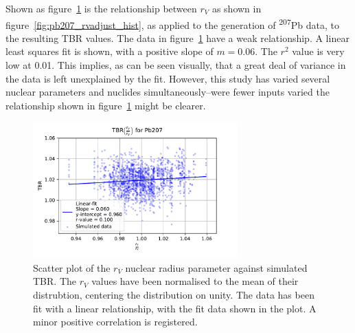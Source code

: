 Shown as figure~\ref{fig:pb207_rvadjust} is the relationship between $r_{V}$ as shown in figure~\ref{fig:pb207_rvadjust_hist}, as applied to the generation of \textsuperscript{207}Pb data, to the resulting TBR values. The data in figure~\ref{fig:pb207_rvadjust} have a weak relationship. A linear least squares fit is shown, with a positive slope of $m=0.06$. The $r^{2}$ value is very low at 0.01. This implies, as can be seen visually, that a great deal of variance in the data is left unexplained by the fit. However, this study has varied several nuclear parameters and nuclides simultaneously--were fewer inputs varied the relationship shown in figure~\ref{fig:pb207_rvadjust} might be clearer. 

\begin{figure}[H]
  \centering
	\includegraphics[width=0.7\textwidth]{Pb207_rvadjust}
	\caption{Scatter plot of the $r_{V}$ nuclear radius parameter against simulated TBR. The $r_{V}$ values have been normalised to the mean of their distrubtion, centering the distribution on unity. The data has been fit with a linear relationship, with the fit data shown in the plot. A minor positive correlation is registered.}
	\label{fig:pb207_rvadjust}
\end{figure}

